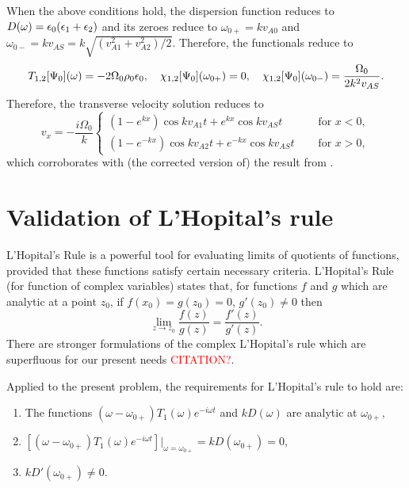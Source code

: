 \documentclass[12pt]{../style-files/ociamthesis}
\begin{document}
When the above conditions hold, the dispersion function reduces to $D(\omega) = \epsilon_0(\epsilon_1 + \epsilon_2)$ and its zeroes reduce to $\omega_{0+} = kv_{A0}$ and $\omega_{0-} = kv_{AS} = k \sqrt{(v_{A1}^2 + v_{A2}^2) / 2}$. Therefore, the functionals reduce to
\begin{equation}
T_{1,2}[\Psi_0](\omega) = -2\Omega_0\rho_0 \epsilon_0,
\quad 
\chi_{1,2}[\Psi_0](\omega_{0+}) = 0,
\quad
\chi_{1,2}[\Psi_0](\omega_{0-}) = \frac{\Omega_0}{2k^2v_{AS}}.
\end{equation}
Therefore, the transverse velocity solution reduces to
\begin{equation}
v_x = -\frac{i\Omega_0}{k} 
\begin{cases}
(1 - e^{kx})\cos{kv_{A1}t} + e^{kx}\cos{kv_{AS}t} \quad &\text{ for } x < 0, \\
(1 - e^{-kx})\cos{kv_{A2}t} + e^{-kx}\cos{kv_{AS}t} \quad &\text{ for } x > 0,
\end{cases}
\end{equation}
which corroborates with (the corrected version of) the result from \cite{rae_etal81}.

\section{Validation of L'Hopital's rule} \label{app: l'hopital}
L'Hopital's Rule is a powerful tool for evaluating limits of quotients of functions, provided that these functions satisfy certain necessary criteria. L'Hopital's Rule (for function of complex variables) states that, for functions $f$ and $g$ which are analytic at a point $z_0$, if $f(x_0) = g(z_0) = 0$, $g'(z_0) \neq 0$ then
\begin{equation}
\lim_{z \to z_0}\frac{f(z)}{g(z)} = \frac{f'(z)}{g'(z)}.
\end{equation}
There are stronger formulations of the complex L'Hopital's rule which are superfluous for our present needs \textcolor{red}{CITATION?}.

Applied to the present problem, the requirements for L'Hopital's rule to hold are:
\begin{enumerate}
	\item The functions $(\omega - \omega_{0+}) T_1(\omega) e^{-i\omega t}$ and $kD(\omega)$ are analytic at $\omega_{0+}$,
	\item $[(\omega - \omega_{0+}) T_1(\omega) e^{-i\omega t}]|_{\omega = \omega_{0+}} = kD(\omega_{0+}) = 0$,
	\item $kD'(\omega_{0+}) \neq 0$.
\end{enumerate}
\end{document}

